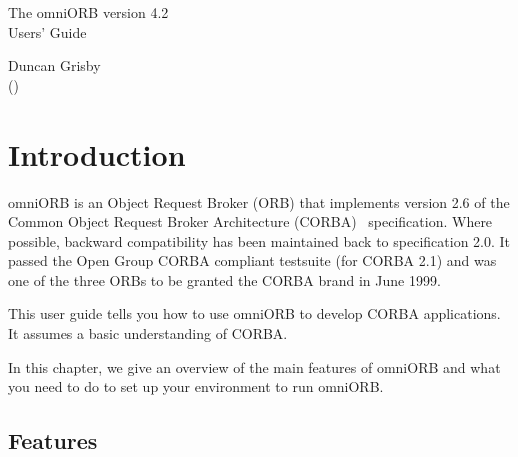 \documentclass[11pt,oneside,a4paper]{book}
\begin{document}
\pagestyle{empty}

\begin{center}

\vfill

{ \Huge
The omniORB version 4.2\\[4mm]
Users' Guide
}

\vfill

{ \Large
Duncan Grisby\\
{\normalsize (\textit{\href{mailto:dgrisby@apasphere.com}%
                           {}})}%
                           \\[2ex]
}

\vfill

\end{center}

\cleardoublepage

\tableofcontents

\cleardoublepage

\pagestyle{headings}


\mainmatter


\chapter{Introduction}

omniORB is an Object Request Broker (ORB) that implements version 2.6
of the Common Object Request Broker Architecture
(CORBA)~\cite{corba26-spec} specification. Where possible, backward
compatibility has been maintained back to specification 2.0. It passed
the Open Group CORBA compliant testsuite (for CORBA 2.1) and was one
of the three ORBs to be granted the CORBA brand in June 1999.

This user guide tells you how to use omniORB to develop CORBA
applications. It assumes a basic understanding of CORBA.

In this chapter, we give an overview of the main features of omniORB
and what you need to do to set up your environment to run omniORB.

\section{Features}
\end{document}
